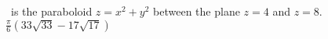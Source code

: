 {\surfaceS\ is the paraboloid $z = x^2 + y^2$ between the plane $z = 4$ and $z = 8$.
}
{$\frac{\pi}{6} \left( 33 \sqrt{33} - 17 \sqrt{17}\right)$}
